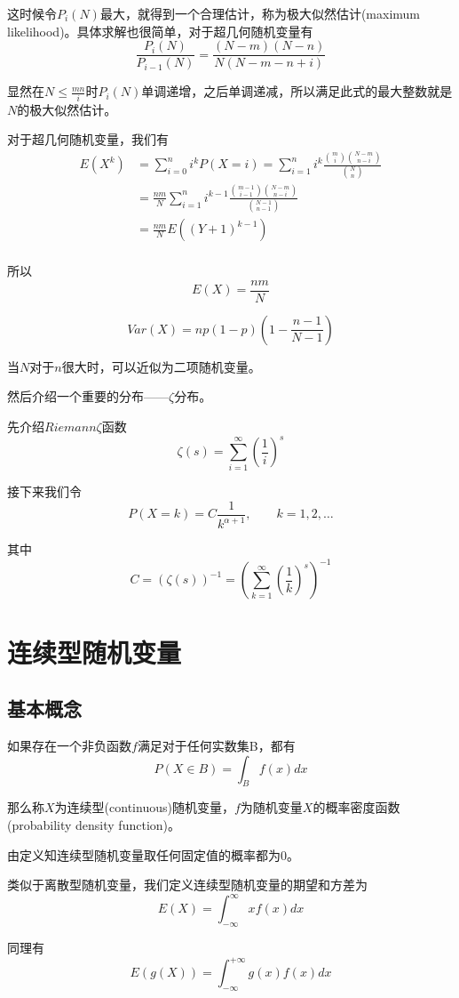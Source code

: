 \documentclass[UTF8]{ctexart}
\begin{document}
这时候令$P_{i}(N)$最大，就得到一个合理估计，称为极大似然估计(maximum likelihood)。具体求解也很简单，对于超几何随机变量有
$$\frac{P_{i}(N)}{P_{i-1}(N)}=\frac{(N-m)(N-n)}{N(N-m-n+i)}$$

显然在$N\leq \frac{mn}{i}$时$P_{i}(N)$单调递增，之后单调递减，所以满足此式的最大整数就是$N$的极大似然估计。

对于超几何随机变量，我们有
$$\begin{aligned}
E(X^{k})&=\sum_{i=0}^{n}i^{k}P(X=i)=\sum_{i=1}^{n}i^{k}\frac{\binom{m}{i} \binom{N-m}{n-i}}{\binom{N}{n}}\\
&=\frac{nm}{N}\sum_{i=1}^{n}i^{k-1}\frac{\binom{m-1}{i-1}\binom{N-m}{n-i}}{\binom{N-1}{n-1}}\\
&=\frac{nm}{N}E((Y+1)^{k-1})\\
\end{aligned}$$

所以
$$E(X)=\frac{nm}{N}$$

$$Var(X)=np(1-p)(1-\frac{n-1}{N-1})$$

当$N$对于$n$很大时，可以近似为二项随机变量。

然后介绍一个重要的分布——$\zeta $分布。

先介绍$Riemann\zeta $函数
$$\zeta (s)=\sum_{i=1}^{\infty } (\frac{1}{i})^{s}$$

接下来我们令
$$P(X=k)=C\frac{1}{k^{\alpha +1}},\qquad k=1,2,\ldots $$

其中
$$C=(\zeta (s))^{-1}=(\sum_{k=1}^{\infty } (\frac{1}{k})^{s})^{-1}$$

\section{连续型随机变量}

\subsection{基本概念}

如果存在一个非负函数$f$满足对于任何实数集B，都有
$$P(X\in B)=\int_{B}f(x)dx $$

那么称$X$为连续型(continuous)随机变量，$f$为随机变量$X$的概率密度函数(probability density function)。

由定义知连续型随机变量取任何固定值的概率都为$0$。

类似于离散型随机变量，我们定义连续型随机变量的期望和方差为
$$E(X)=\int_{-\infty }^{\infty }xf(x)dx $$

同理有
$$E(g(X))=\int_{-\infty }^{+\infty }g(x)f(x)dx $$
\end{document}
